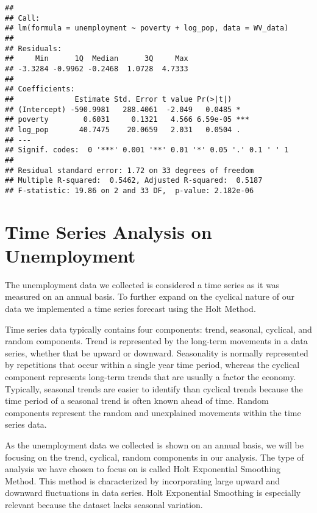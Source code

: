 \documentclass[
]{article}
\begin{document}
\begin{verbatim}
## 
## Call:
## lm(formula = unemployment ~ poverty + log_pop, data = WV_data)
## 
## Residuals:
##     Min      1Q  Median      3Q     Max 
## -3.3284 -0.9962 -0.2468  1.0728  4.7333 
## 
## Coefficients:
##              Estimate Std. Error t value Pr(>|t|)    
## (Intercept) -590.9981   288.4061  -2.049   0.0485 *  
## poverty        0.6031     0.1321   4.566 6.59e-05 ***
## log_pop       40.7475    20.0659   2.031   0.0504 .  
## ---
## Signif. codes:  0 '***' 0.001 '**' 0.01 '*' 0.05 '.' 0.1 ' ' 1
## 
## Residual standard error: 1.72 on 33 degrees of freedom
## Multiple R-squared:  0.5462, Adjusted R-squared:  0.5187 
## F-statistic: 19.86 on 2 and 33 DF,  p-value: 2.182e-06
\end{verbatim}

\hypertarget{time-series-analysis-on-unemployment}{%
\section{Time Series Analysis on
Unemployment}\label{time-series-analysis-on-unemployment}}

The unemployment data we collected is considered a time series as it was
measured on an annual basis. To further expand on the cyclical nature of
our data we implemented a time series forecast using the Holt Method.

Time series data typically contains four components: trend, seasonal,
cyclical, and random components. Trend is represented by the long-term
movements in a data series, whether that be upward or downward.
Seasonality is normally represented by repetitions that occur within a
single year time period, whereas the cyclical component represents
long-term trends that are usually a factor the economy. Typically,
seasonal trends are easier to identify than cyclical trends because the
time period of a seasonal trend is often known ahead of time. Random
components represent the random and unexplained movements within the
time series data.

As the unemployment data we collected is shown on an annual basis, we
will be focusing on the trend, cyclical, random components in our
analysis. The type of analysis we have chosen to focus on is called Holt
Exponential Smoothing Method. This method is characterized by
incorporating large upward and downward fluctuations in data series.
Holt Exponential Smoothing is especially relevant because the dataset
lacks seasonal variation.
\end{document}
